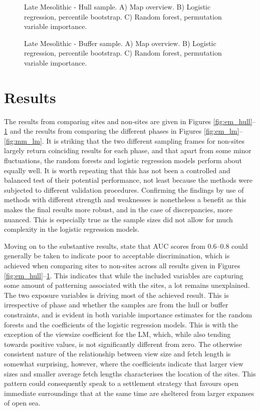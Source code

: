 \documentclass[12pt, a4paper]{article}
\begin{document}
\begin{figure}
	\caption[Late Mesolithic - Hull sample]{Late Mesolithic - Hull sample. A) Map overview. B) Logistic regression, percentile bootstrap. C) Random forest, permutation variable importance.}
	\label{fig:lm_hull}
\bigbreak
	\caption[Late Mesolithic - Buffer sample]{Late Mesolithic - Buffer sample. A) Map overview. B) Logistic regression, percentile bootstrap. C) Random forest, permutation variable importance.}
	\label{fig:lm_buff}
\end{figure}

\section{Results}
The results from comparing sites and non-sites are given in Figures \ref{fig:em_hull}--\ref{fig:lm_buff} and the results from comparing the different phases in Figures \ref{fig:em_lm}--\ref{fig:mm_lm}. It is striking that the two different sampling frames for non-sites largely return coinciding results for each phase, and that apart from some minor fluctuations, the random forests and logistic regression models perform about equally well. It is worth repeating that this has not been a controlled and balanced test of their potential performance, not least because the methods were subjected to different validation procedures. Confirming the findings by use of methods with different strength and weaknesses is nonetheless a benefit as this makes the final results more robust, and in the case of discrepancies, more nuanced. This is especially true as the sample sizes did not allow for much complexity in the logistic regression models.\par
Moving on to the substantive results, \citet[][177]{hosmer2013} state that AUC scores from 0.6--0.8 could generally be taken to indicate poor to acceptable discrimination, which is achieved when comparing sites to non-sites across all results given in Figures \ref{fig:em_hull}--\ref{fig:lm_buff}. This indicates that while the included variables are capturing some amount of patterning associated with the sites, a lot remains unexplained. The two exposure variables is driving most of the achieved result. This is irrespective of phase and whether the samples are from the hull or buffer constraints, and is evident in both variable importance estimates for the random forests and the coefficients of the logistic regression models. This is with the exception of the viewsize coefficient for the LM, which, while also tending towards positive values, is not significantly different from zero. The otherwise consistent nature of the relationship between view size and fetch length is somewhat surprising, however, where the coefficients indicate that larger view sizes and smaller average fetch lengths characterises the location of the sites. This pattern could consequently speak to a settlement strategy that favours open immediate surroundings that at the same time are sheltered from larger expanses of open sea. \par 
\end{document}
